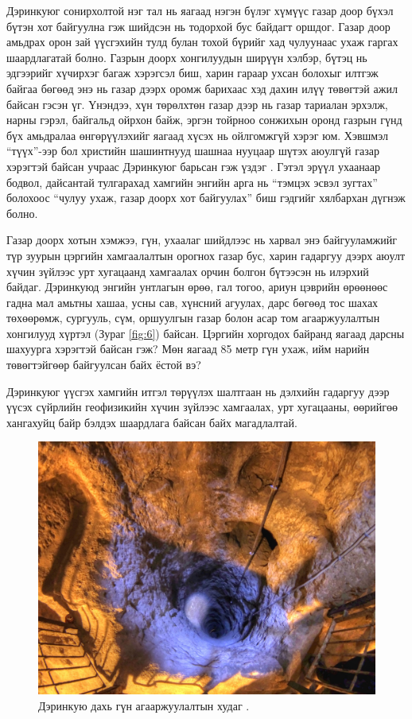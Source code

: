 \documentclass[10pt,twocolumn,letterpaper]{article}
\begin{document}
Дэринкуюг сонирхолтой нэг тал нь яагаад нэгэн бүлэг хүмүүс газар доор бүхэл бүтэн хот байгуулна гэж шийдсэн нь тодорхой бус байдагт оршдог. Газар доор амьдрах орон зай үүсгэхийн тулд булан тохой бүрийг хад чулуунаас ухаж гаргах шаардлагатай болно. Газрын доорх хонгилуудын ширүүн хэлбэр, бүтэц нь эдгээрийг хүчирхэг багаж хэрэгсэл биш, харин гараар ухсан болохыг илтгэж байгаа бөгөөд энэ нь газар дээрх оромж барихаас хэд дахин илүү төвөгтэй ажил байсан гэсэн үг. Үнэндээ, хүн төрөлхтөн газар дээр нь газар тариалан эрхэлж, нарны гэрэл, байгальд ойрхон байж, эргэн тойрноо сонжихын оронд газрын гүнд бүх амьдралаа өнгөрүүлэхийг яагаад хүсэх нь ойлгомжгүй хэрэг юм. Хэвшмэл “түүх”-ээр бол христийн шашинтнууд шашнаа нууцаар шүтэх аюулгүй газар хэрэгтэй байсан учраас Дэринкуюг барьсан гэж үздэг \cite{53}. Гэтэл эрүүл ухаанаар бодвол, дайсантай тулгарахад хамгийн энгийн арга нь “тэмцэх эсвэл зугтах” болохоос “чулуу ухаж, газар доорх хот байгуулах” биш гэдгийг хялбархан дүгнэж болно.

Газар доорх хотын хэмжээ, гүн, ухаалаг шийдлээс нь харвал энэ байгууламжийг түр зуурын цэргийн хамгаалалтын орогнох газар бус, харин гадаргуу дээрх аюулт хүчин зүйлээс урт хугацаанд хамгаалах орчин болгон бүтээсэн нь илэрхий байдаг. Дэринкуюд энгийн унтлагын өрөө, гал тогоо, ариун цэврийн өрөөнөөс гадна мал амьтны хашаа, усны сав, хүнсний агуулах, дарс бөгөөд тос шахах төхөөрөмж, сургууль, сүм, оршуулгын газар болон асар том агааржуулалтын хонгилууд хүртэл (Зураг \ref{fig:6}) байсан. Цэргийн хоргодох байранд яагаад дарсны шахуурга хэрэгтэй байсан гэж? Мөн яагаад 85 метр гүн ухаж, ийм нарийн төвөгтэйгөөр байгуулсан байх ёстой вэ?

Дэринкуюг үүсгэх хамгийн итгэл төрүүлэх шалтгаан нь дэлхийн гадаргуу дээр үүсэх сүйрлийн геофизикийн хүчин зүйлээс хамгаалах, урт хугацааны, өөрийгөө хангахуйц байр бэлдэх шаардлага байсан байх магадлалтай.

\begin{figure}[t]
\begin{center}
   \includegraphics[width=1\linewidth]{derinkuyu-air.jpg}
\end{center}
   \caption{Дэринкую дахь гүн агааржуулалтын худаг \cite{53}.}
\label{fig:6}
\label{fig:onecol}
\end{figure}
\end{document}
